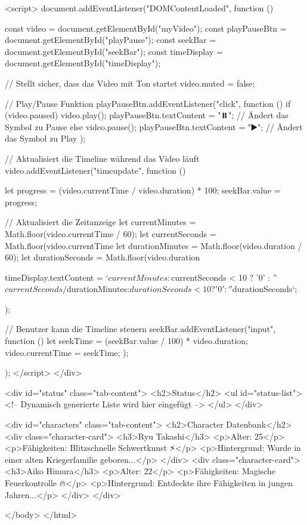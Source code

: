         <script>
            document.addEventListener("DOMContentLoaded", function () {
                const video = document.getElementById("myVideo");
                const playPauseBtn = document.getElementById("playPause");
                const seekBar = document.getElementById("seekBar");
                const timeDisplay = document.getElementById("timeDisplay");

                // Stellt sicher, dass das Video mit Ton startet
                video.muted = false;

                // Play/Pause Funktion
                playPauseBtn.addEventListener("click", function () {
                    if (video.paused) {
                        video.play();
                        playPauseBtn.textContent = "⏸️"; // Ändert das Symbol zu Pause
                    } else {
                        video.pause();
                        playPauseBtn.textContent = "▶️"; // Ändert das Symbol zu Play
                    }
                });

                // Aktualisiert die Timeline während das Video läuft
                video.addEventListener("timeupdate", function () {
                    let progress = (video.currentTime / video.duration) * 100;
                    seekBar.value = progress;

                    // Aktualisiert die Zeitanzeige
                    let currentMinutes = Math.floor(video.currentTime / 60);
                    let currentSeconds = Math.floor(video.currentTime %
                    let durationMinutes = Math.floor(video.duration / 60);
                    let durationSeconds = Math.floor(video.duration %
                    
                    timeDisplay.textContent = `${currentMinutes}:${currentSeconds < 10 ? '0' : ''}${currentSeconds} / ${durationMinutes}:${durationSeconds < 10 ? '0' : ''}${durationSeconds}`;
                });

                // Benutzer kann die Timeline steuern
                seekBar.addEventListener("input", function () {
                    let seekTime = (seekBar.value / 100) * video.duration;
                    video.currentTime = seekTime;
                });
            });
        </script>
    </div>

    <div id="status" class="tab-content">
        <h2>Status</h2>
        <ul id="status-list">
            <!-- Dynamisch generierte Liste wird hier eingefügt -->
        </ul>
    </div>

    <div id="characters" class="tab-content">
        <h2>Character Datenbank</h2>
        <div class="character-card">
            <h3>Ryu Takashi</h3>
            <p>Alter: 25</p>
            <p>Fähigkeiten: Blitzschnelle Schwertkunst ⚡</p>
            <p>Hintergrund: Wurde in einer alten Kriegerfamilie geboren...</p>
        </div>
        <div class="character-card">
            <h3>Aiko Himura</h3>
            <p>Alter: 22</p>
            <p>Fähigkeiten: Magische Feuerkontrolle 🔥</p>
            <p>Hintergrund: Entdeckte ihre Fähigkeiten in jungen Jahren...</p>
        </div>
    </div>

</body>
</html>
